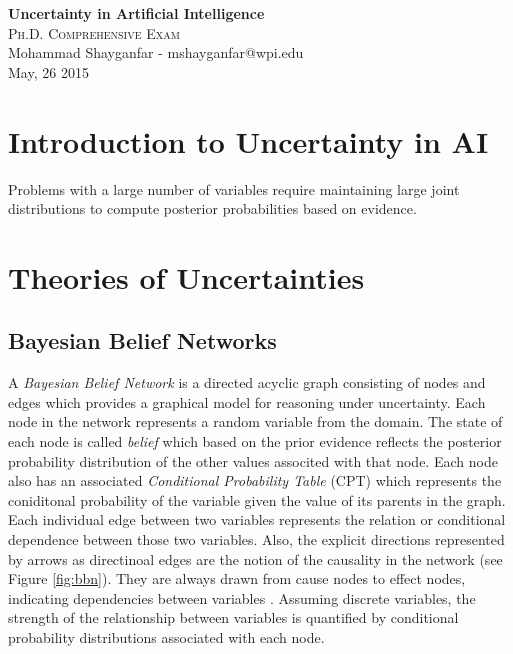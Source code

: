 \documentclass[11pt]{article}
\begin{document}

\begin{center}
{\LARGE{\textbf{Uncertainty in Artificial Intelligence}}} \\
\Large\textsc{Ph.D. Comprehensive Exam} \\[1em]
\large\textnormal{Mohammad Shayganfar - mshayganfar@wpi.edu} \\
\large\textnormal{May, 26 2015}
\end{center}

\section{Introduction to Uncertainty in AI}

Problems with a large number of variables require maintaining large joint
distributions to compute posterior probabilities based on evidence.

\section{Theories of Uncertainties}

\subsection{Bayesian Belief Networks}

A \textit{Bayesian Belief Network} \cite{pearl:probabilistic-reasoning} is a 
directed acyclic graph consisting of nodes and edges which provides a graphical
model for reasoning under uncertainty. Each node in the network represents a
random variable from the domain. The state of each node is called
\textit{belief} which based on the prior evidence reflects the posterior
probability distribution of the other values associted with that node. Each node
also has an associated \textit{Conditional Probability Table} (CPT) which
represents the coniditonal probability of the variable given the value of its
parents in the graph. Each individual edge between two variables represents the
relation or conditional dependence between those two variables. Also, the
explicit directions represented by arrows as directinoal edges are the notion of
the causality in the network (see Figure \ref{fig:bbn}). They are always drawn
from cause nodes to effect nodes, indicating dependencies between variables
\cite{das:decision-making-agents}. Assuming discrete variables, the strength of
the relationship between variables is quantified by conditional probability
distributions associated with each node.
\end{document}
